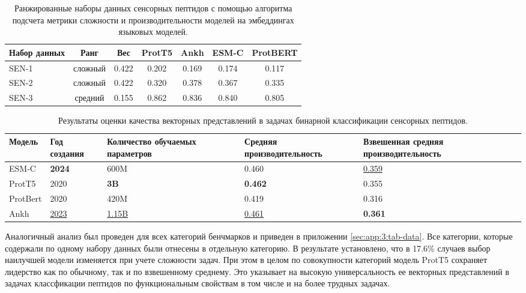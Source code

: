 \documentclass[specification,annotation,times]{itmo-student-thesis}
\begin{document}
\begin{table}[h]
\centering
\small
\caption{Ранжированные наборы данных сенсорных пептидов с помощью алгоритма подсчета метрики сложности и производительности моделей на эмбеддингах языковых моделей.}
\label{tab:model_performance}

\begin{tabular}{|p{4cm}|c|c|c|c|c|c|}
\hline
Набор данных & Ранг & Вес & ProtT5 & Ankh & ESM-C & ProtBERT \\
\hline
SEN-1~\cite{manavalan2018ibce} & сложный & 0.422 & 0.202 & 0.169 & 0.174 & 0.117 \\ \hline
SEN-2~\cite{zhao2003application} & сложный & 0.422 & 0.320 & 0.378 & 0.367 & 0.335 \\ \hline
SEN-3~\cite{wei2020icircda} & средний & 0.155 & 0.862 & 0.836 & 0.840 & 0.805 \\ \hline
\end{tabular}

\end{table}


\begin{table}[h]
\centering
\small
\caption{Результаты оценки качества векторных представлений в задачах бинарной классификации сенсорных пептидов.}
\label{tab:compare_results}

\begin{tabular}{|p{2cm}|p{1.8cm}|p{2.8cm}|p{3.6cm}|p{3.6cm}|}
\hline
Модель & Год \newline создания & Количество \newline обучаемых \newline параметров & Средняя \newline производительность & Взвешенная \newline средняя \newline производительность \\
\hline
ESM-C & \textbf{2024} & 600M & 0.460 & \underline{0.359} \\ \hline
ProtT5 & 2020 & \textbf{3B} & \textbf{0.462} & 0.355 \\ \hline
ProtBert & 2020 & 420M & 0.419 & 0.316 \\ \hline
Ankh & \underline{2023} & \underline{1.15B} & \underline{0.461} & \textbf{0.361} \\ \hline
\end{tabular}

\end{table}

Аналогичный анализ был проведен для всех категорий бенчмарков и приведен в приложении \ref{sec:app:3:tab-data}. 
Все категории, которые содержали по одному набору данных были отнесены в отдельную категорию.
В результате установлено, что в 17.6\% случаев выбор наилучшей модели изменяется при учете сложности задач. 
При этом в целом по совокупности категорий модель ProtT5 сохраняет лидерство как по обычному, 
так и по взвешенному среднему. 
Это указывает на высокую универсальность ее векторных представлений в задачах классфикации пептидов 
по функциональным свойствам в том числе и на более трудных задачах.
\end{document}
